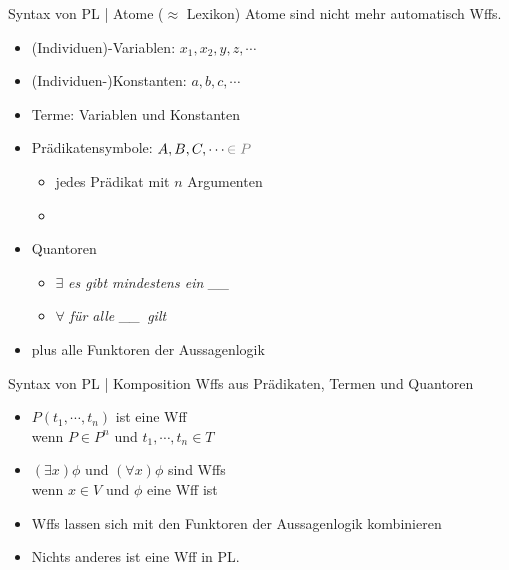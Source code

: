 \begin{frame}
  {Syntax von PL | Atome ($\approx$ Lexikon)}
  \onslide<+->
  \onslide<+->
  Atome sind nicht mehr automatisch Wffs.\\
  \Halbzeile
  \begin{itemize}[<+->]
    \item \alert{(Individuen)-Variablen}: $x_1, x_2, y, z, \cdots$ 
    \item \alert{(Individuen-)Konstanten}: $a, b, c, \cdots$ 
    \item \alert{Terme}: Variablen und Konstanten 
    \item \alert{Prädikatensymbole}: $A, B, C, \cdots \grau{\in P}$
      \begin{itemize}[<+->]
        \item jedes Prädikat mit $n$ Argumenten 
        \item {}
      \end{itemize}
    \item \alert{Quantoren}
      \begin{itemize}[<+->]
        \item $\exists$ \textit{es gibt mindestens ein \_\_}
        \item $\forall$ \textit{für alle \_\_\ gilt}
      \end{itemize}
    \item plus alle \alert{Funktoren} der Aussagenlogik
  \end{itemize}
\end{frame}

\begin{frame}
  {Syntax von PL | Komposition}
  \onslide<+->
  \onslide<+->
  Wffs aus Prädikaten, Termen und Quantoren\\
  \Halbzeile
  \begin{itemize}[<+->]
    \item \alert{$P(t_1,\cdots,t_n)$} ist eine Wff\\
      wenn \alert{$P\in P^n$} und \alert{$t_1,\cdots,t_n\in T$}
      \Halbzeile
    \item \alert{$(\exists x)\phi$} und \alert{$(\forall x)\phi$} sind Wffs\\
      wenn \alert{$x\in V$} und \alert{$\phi$ eine Wff} ist
      \Halbzeile
    \item Wffs lassen sich mit den Funktoren der Aussagenlogik kombinieren
      \Halbzeile
    \item Nichts anderes ist eine Wff in PL.\\
  \end{itemize}
\end{frame}

